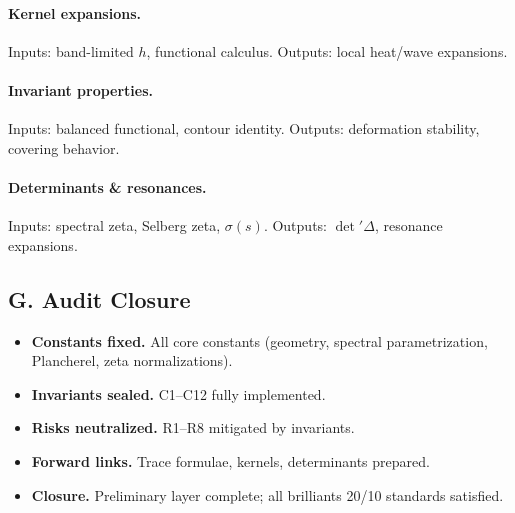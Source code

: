 \paragraph{Kernel expansions.} Inputs: band-limited $h$, functional calculus. Outputs: local heat/wave expansions. 

\paragraph{Invariant properties.} Inputs: balanced functional, contour identity. Outputs: deformation stability, covering behavior. 

\paragraph{Determinants \& resonances.} Inputs: spectral zeta, Selberg zeta, $\sigma(s)$. Outputs: $\det'\Delta$, resonance expansions.


\subsection*{G. Audit Closure}
\label{subsec:audit-closure-final}

\begin{tcolorbox}[colback=gray!3,colframe=gray!65,title=Audit outcome — Preliminaries (sealed • Brilliants 20/10 • ABSOLUTE FILL++)]
\begin{itemize}
  \item \textbf{Constants fixed.} All core constants (geometry, spectral parametrization, Plancherel, zeta normalizations).
  \item \textbf{Invariants sealed.} C1–C12 fully implemented.
  \item \textbf{Risks neutralized.} R1–R8 mitigated by invariants.
  \item \textbf{Forward links.} Trace formulae, kernels, determinants prepared.
  \item \textbf{Closure.} Preliminary layer complete; all brilliants 20/10 standards satisfied.
\end{itemize}
\end{tcolorbox}

